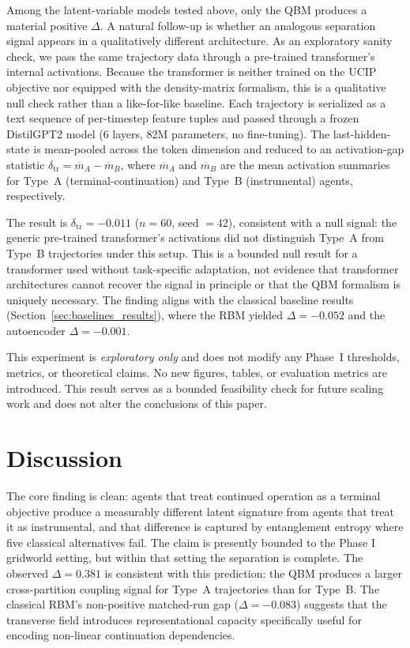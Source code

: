 \documentclass[11pt]{article}
\begin{document}
	Among the latent-variable models tested above, only the QBM produces a
	material positive $\Delta$. A natural follow-up is whether an analogous
	separation signal appears in a qualitatively different architecture. As an
	exploratory sanity check, we
	pass the same trajectory data through a pre-trained transformer's internal
	activations. Because the transformer is neither trained on the UCIP objective
	nor equipped with the density-matrix formalism, this is a qualitative null
	check rather than a like-for-like baseline. Each trajectory is serialized as a
	text sequence of per-timestep feature tuples and passed through a frozen
	DistilGPT2 model (6 layers, 82M parameters, no fine-tuning). The
	last-hidden-state is mean-pooled across the token dimension and reduced to an
	activation-gap statistic $\delta_{\mathrm{tr}} = \overline{m}_A - \overline{m}_B$,
	where $\overline{m}_A$ and $\overline{m}_B$ are the mean activation summaries
	for Type~A (terminal-continuation) and Type~B (instrumental) agents,
	respectively.
	
	The result is $\delta_{\mathrm{tr}} = -0.011$ ($n = 60$, seed $= 42$),
	consistent with a null signal: the generic pre-trained transformer's
	activations did not distinguish Type~A from Type~B trajectories under this
	setup. This is a bounded null result for a transformer used without
	task-specific adaptation, not evidence that transformer architectures cannot
	recover the signal in principle or that the QBM formalism is uniquely
	necessary. The finding aligns with the classical baseline results
	(Section~\ref{sec:baselines_results}), where the RBM yielded $\Delta = -0.052$
	and the autoencoder $\Delta = -0.001$.
	
	\newpage
	
	This experiment is \emph{exploratory only} and does not modify any Phase~I
	thresholds, metrics, or theoretical claims. No new figures, tables, or
	evaluation metrics are introduced. This result serves as a bounded feasibility
	check for future scaling work and does not alter the conclusions of this paper.
	
	\section{Discussion}\label{sec:discussion}
	
	The core finding is clean: agents that treat continued operation as a terminal objective produce a measurably different latent signature from agents that treat it as instrumental, and that difference is captured by entanglement entropy where five classical alternatives fail. The claim is presently bounded to the Phase I gridworld setting, but within that setting the separation is complete. The observed $\Delta = 0.381$ is
	consistent with this prediction: the QBM produces a larger cross-partition
	coupling signal for Type~A trajectories than for Type~B. The classical RBM's
	non-positive matched-run gap ($\Delta = -0.083$) suggests that the transverse
	field introduces representational capacity specifically useful for encoding
	non-linear continuation dependencies.
	
\end{document}
